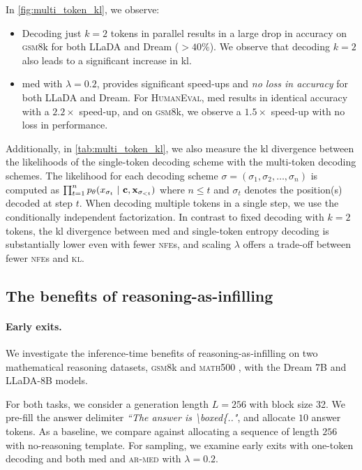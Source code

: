 In \cref{fig:multi_token_kl}, we observe:
\begin{itemize}[leftmargin=*]
    \item Decoding just $k=2$ tokens in parallel results in a large drop in accuracy on \textsc{gsm8}k for both LLaDA and Dream ($>40\%$). We observe that decoding $k=2$ also leads to a significant increase in \gls{kl}. 
    \item \gls{med} with $\lambda=0.2$, provides significant speed-ups and \textit{no loss in accuracy} for both LLaDA and Dream. For \textsc{HumanEval}, \gls{med} results in identical accuracy with a $2.2\times$ speed-up, and on \textsc{gsm8}k, we observe a $1.5\times$ speed-up with no loss in performance. 
\end{itemize}

Additionally, in \cref{tab:multi_token_kl}, we also measure the \gls{kl} divergence between the likelihoods of the single-token decoding scheme with the multi-token decoding schemes. The likelihood for each decoding scheme $\sigma = (\sigma_1, \sigma_2, \dots, \sigma_n)$ is computed as $\prod_{t=1}^{n} p_\theta(x_{\sigma_t} ~\vert~ \mathbf{c}, \mathbf{x}_{\sigma_{<t}})$ where $n \leq t$ and $\sigma_t$ denotes the position(s) decoded at step $t$. When decoding multiple tokens in a single step, we use the conditionally independent factorization. In contrast to fixed decoding with $k=2$ tokens, the \gls{kl} divergence between \gls{med} and single-token entropy decoding is substantially lower even with fewer \textsc{nfe}s, and scaling $\lambda$ offers a trade-off between fewer \textsc{nfe}s and \textsc{kl}.

    
\subsection{The benefits of {reasoning-as-infilling}}
\paragraph{Early exits.} We investigate the inference-time benefits of {reasoning-as-infilling} on two mathematical reasoning datasets, \textsc{gsm8}k \citep{lightman2023letsverifystepstep} and \textsc{math500} \citep{cobbe2021training}, with the Dream 7B and LLaDA-8B models. 

For both tasks, we consider a generation length $L = 256$ with block size 32. We pre-fill the answer delimiter \textit{``The answer is \textbackslash boxed\{.."}, and allocate $10$ answer tokens. As a baseline, we compare against allocating a sequence of length $256$ with no-reasoning template. For sampling, we examine early exits with one-token decoding and both \gls{med} and \textsc{ar-med} with $\lambda = 0.2$. 

